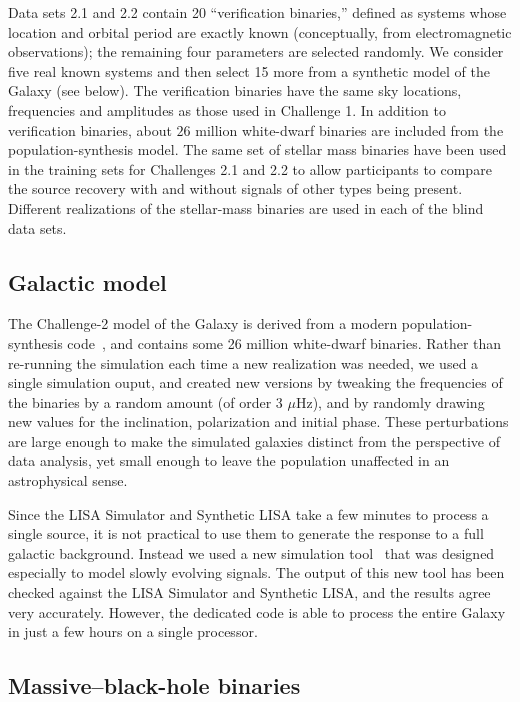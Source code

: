 \documentclass{iopart}
\begin{document}
Data sets 2.1 and 2.2 contain 20 ``verification binaries,'' defined as systems whose location and orbital period are exactly known (conceptually, from electromagnetic observations); the remaining four parameters are selected randomly. We consider five real known systems and then select 15 more from a synthetic model of the Galaxy (see below). The verification binaries have the same sky locations, frequencies and amplitudes as those used in Challenge 1. In addition to verification binaries, about $26$ million
white-dwarf binaries are included from the population-synthesis model. The same set of stellar mass binaries have been used in the training sets for Challenges 2.1 and 2.2 to allow participants to compare the source recovery with and without signals of other types being present. Different realizations of the stellar-mass binaries are used in each of the blind data sets.

\subsection{Galactic model}
\label{ss:galaxy}

The Challenge-2 model of the Galaxy is derived from a modern population-synthesis code~\cite{gijs}, and contains some 26 million white-dwarf binaries. Rather than re-running the simulation each time a new realization was needed, we used a single simulation ouput, and created
new versions by tweaking the frequencies of the binaries by a random amount (of order 3 $\mu$Hz),
and by randomly drawing new values for the inclination, polarization and initial phase. These perturbations are large enough to make the
simulated galaxies distinct from the perspective of data analysis, yet small enough to leave the population unaffected in an astrophysical sense. 

Since the LISA Simulator and Synthetic LISA take a few minutes to process a single source, it is not practical to use them to generate the response to a full galactic background. Instead we used a new simulation tool~\cite{cornishlittenberg} that was designed especially to model slowly evolving signals. The output of this new tool has been checked against the LISA Simulator and Synthetic LISA, and the results agree very accurately. However, the dedicated code is able to process the entire Galaxy in just a few hours on a single processor.

\subsection{Massive--black-hole binaries}
\end{document}

